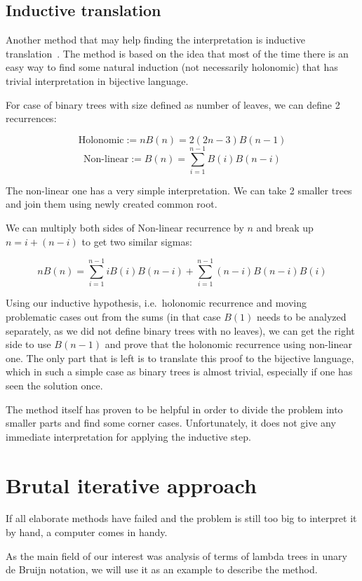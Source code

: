 \documentclass[final]{article}
\theoremstyle{definition}
\theoremstyle{definition}
\theoremstyle{remark}
\begin{document}
\subsection{Inductive translation}%
\label{sub:inductive_translation}

Another method that may help finding the interpretation is inductive translation~\cite{doron}. The method is based on the idea that most of the time there is an easy way to find some natural induction (not necessarily holonomic) that has trivial interpretation in bijective language.

For case of binary trees with size defined as number of leaves, we can define 2 recurrences:

\[\text{Holonomic} := nB(n) = 2 (2n - 3)B(n - 1)\]
\[\text{Non-linear} := B(n) = \sum_{i=1}^{n - 1} B(i) B(n - i)\]

The non-linear one has a very simple interpretation. We can take 2 smaller trees and join them using newly created common root.

We can multiply both sides of Non-linear recurrence by \(n\) and break up \(n = i + (n - i)\) to get two similar sigmas:

\[n B(n) = \sum_{i=1}^{n - 1} i B(i) B(n - i) + \sum_{i=1}^{n - 1} (n - i) B(n - i) B(i)\]

Using our inductive hypothesis, i.e.\ holonomic recurrence and moving problematic cases out from the sums (in that case \(B(1)\) needs to be analyzed separately, as we did not define binary trees with no leaves), we can get the right side to use \(B(n - 1)\) and prove that the holonomic recurrence using non-linear one. The only part that is left is to translate this proof to the bijective language, which in such a simple case as binary trees is almost trivial, especially if one has seen the solution once.

The method itself has proven to be helpful in order to divide the problem into smaller parts and find some corner cases. Unfortunately, it does not give any immediate interpretation for applying the inductive step.

\section{Brutal iterative approach}%
\label{sec:brutal_iterative_approach}

If all elaborate methods have failed and the problem is still too big to interpret it by hand, a computer comes in handy.

As the main field of our interest was analysis of terms of lambda trees in unary de Bruijn notation, we will use it as an example to describe the method.
\end{document}
